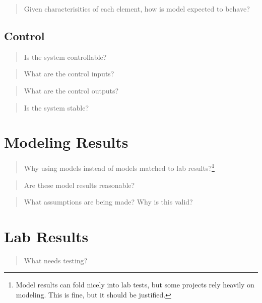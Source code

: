 \documentclass[
  10pt,
  draftcls,
  technote,
  letterpaper,
  oneside,
  onecolumn]{IEEEtran}
\begin{document}
\begin{quote}
Given characterisitics of each element, how is model expected to behave?
\end{quote}

\hypertarget{control}{%
\subsection{Control}\label{control}}

\begin{quote}
Is the system controllable?
\end{quote}

\begin{quote}
What are the control inputs?
\end{quote}

\begin{quote}
What are the control outputs?
\end{quote}

\begin{quote}
Is the system stable?
\end{quote}

\hypertarget{modeling-results}{%
\section{Modeling Results}\label{modeling-results}}

\begin{quote}
Why using models instead of models matched to lab results?\footnote{Model
  results can fold nicely into lab tests, but some projects rely heavily
  on modeling. This is fine, but it should be justified.}
\end{quote}

\begin{quote}
Are these model results reasonable?
\end{quote}

\begin{quote}
What assumptions are being made? Why is this valid?
\end{quote}

\hypertarget{lab-results}{%
\section{Lab Results}\label{lab-results}}

\begin{quote}
What needs testing?
\end{quote}
\end{document}
